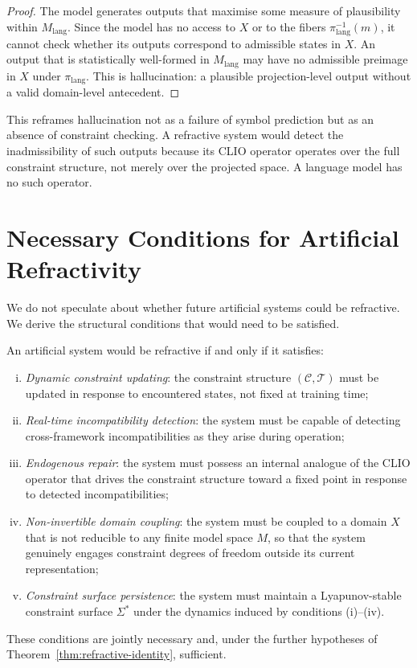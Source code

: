 \documentclass[11pt,openany]{book}
\begin{document}
\begin{proof}
The model generates outputs that maximise some measure of
plausibility within $M_{\mathrm{lang}}$.  Since the model
has no access to $X$ or to the fibers
$\pi_{\mathrm{lang}}^{-1}(m)$, it cannot check whether its
outputs correspond to admissible states in $X$.  An output
that is statistically well-formed in $M_{\mathrm{lang}}$
may have no admissible preimage in $X$ under
$\pi_{\mathrm{lang}}$.  This is hallucination: a plausible
projection-level output without a valid domain-level
antecedent.
\end{proof}

This reframes hallucination not as a failure of symbol
prediction but as an absence of constraint checking.  A
refractive system would detect the inadmissibility of such
outputs because its CLIO operator operates over the full
constraint structure, not merely over the projected space.
A language model has no such operator.

\section{Necessary Conditions for Artificial Refractivity}
\label{sec:future-conditions}

We do not speculate about whether future artificial systems
could be refractive.  We derive the structural conditions
that would need to be satisfied.

\begin{proposition}
\label{prop:future-requirements}
An artificial system would be refractive if and only if it
satisfies:
\begin{enumerate}[(i)]
  \item \emph{Dynamic constraint updating}: the constraint
    structure $(\mathcal{C}, \mathcal{T})$ must be updated
    in response to encountered states, not fixed at
    training time;
  \item \emph{Real-time incompatibility detection}: the
    system must be capable of detecting cross-framework
    incompatibilities as they arise during operation;
  \item \emph{Endogenous repair}: the system must possess
    an internal analogue of the CLIO operator that
    drives the constraint structure toward a fixed point
    in response to detected incompatibilities;
  \item \emph{Non-invertible domain coupling}: the system
    must be coupled to a domain $X$ that is not reducible
    to any finite model space $M$, so that the system
    genuinely engages constraint degrees of freedom
    outside its current representation;
  \item \emph{Constraint surface persistence}: the system
    must maintain a Lyapunov-stable constraint surface
    $\Sigma^*$ under the dynamics induced by conditions
    (i)--(iv).
\end{enumerate}
These conditions are jointly necessary and, under the
further hypotheses of Theorem~\ref{thm:refractive-identity},
sufficient.
\end{proposition}
\end{document}
